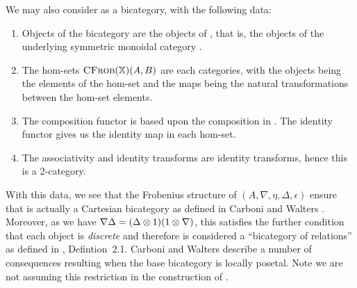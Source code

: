 We may also consider \CFrob as a bicategory\cite{leinster1998basic}, with the following data:
\begin{enumerate}[{(}i{)}]
  \item Objects of the bicategory are the objects of \CFrob, that is, the objects of the underlying
  symmetric monoidal category \X.
  \item The hom-sets $\textsc{CFrob}(\mathbb{X})(A,B)$ are each categories, with the objects being the elements of the
    hom-set and the maps being the natural transformations between the hom-set elements.
  \item The composition functor is based upon the composition in \X. The identity functor gives us
    the identity map in each hom-set.
  \item The associativity and identity transforms are identity transforms, hence this is a 2-category.
\end{enumerate}
With this data, we see that the Frobenius structure of $(A,\nabla,\eta,\Delta,\epsilon)$ ensure that
\CFrob is actually a Cartesian bicategory as defined in Carboni and Walters
\cite{carboni1987cartesian}. Moreover, as we have $\nabla \Delta = (\Delta \otimes1) (1\otimes \nabla)$, this
satisfies the further condition that each object is \emph{discrete} and therefore is considered a
``bicategory of relations'' as defined in \cite{carboni1987cartesian}, Defintion~2.1.
Carboni and Walters describe a number of
consequences resulting when the base bicategory is locally posetal. Note we are not assuming this
restriction in the construction of \CFrob.

